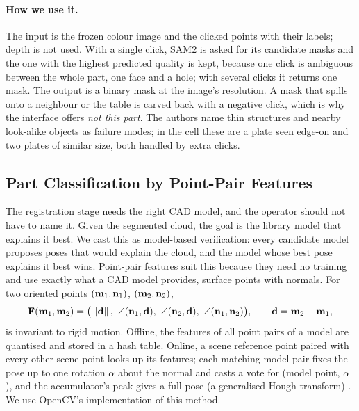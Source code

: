 \paragraph{How we use it.} The input is the frozen colour image and the clicked points with their
labels; depth is not used. With a single click, SAM2 is asked for its candidate masks and the one
with the highest predicted quality is kept, because one click is ambiguous between the whole part,
one face and a hole; with several clicks it returns one mask. The output is a binary mask at the
image's resolution. A mask that spills onto a neighbour or the table is carved back with a
negative click, which is why the interface offers \emph{not this part}. The authors name thin
structures and nearby look-alike objects as failure modes; in the cell these are a plate seen
edge-on and two plates of similar size, both handled by extra clicks.

\subsection{Part Classification by Point-Pair Features}
\label{sec:per_classify}
The registration stage needs the right CAD model, and the operator should not have to name it.
Given the segmented cloud, the goal is the library model that explains it best. We cast this as
model-based verification: every candidate model proposes poses that would explain the cloud, and
the model whose best pose explains it best wins. Point-pair features \cite{drost2010ppf} suit this
because they need no training and use exactly what a CAD model provides, surface points with
normals. For two oriented points $(\mathbf{m}_1,\mathbf{n}_1)$, $(\mathbf{m}_2,\mathbf{n}_2)$,
\begin{equation}
\mathbf{F}(\mathbf{m}_1,\mathbf{m}_2) = \big(\left\lVert\mathbf{d}\right\rVert,\ \angle(\mathbf{n}_1,\mathbf{d}),\
\angle(\mathbf{n}_2,\mathbf{d}),\ \angle(\mathbf{n}_1,\mathbf{n}_2)\big),\qquad
\mathbf{d}=\mathbf{m}_2-\mathbf{m}_1,
\label{eq:ppf}
\end{equation}
is invariant to rigid motion. Offline, the features of all point pairs of a model are quantised and
stored in a hash table. Online, a scene reference point paired with every other scene point looks
up its features; each matching model pair fixes the pose up to one rotation $\alpha$ about the
normal and casts a vote for (model point, $\alpha$), and the accumulator's peak gives a full pose
(a generalised Hough transform) \cite{drost2010ppf}. We use OpenCV's implementation of this method.

